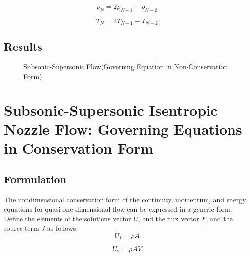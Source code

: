 \begin{equation}
\rho_N=2\rho_{N-1}-\rho_{N-2}
\end{equation}

\begin{equation}
T_N=2T_{N-1}-T_{N-2}
\end{equation}

\subsection{Results}
\begin{figure}[htbp]
\centering
{}%
\centering
{}%
\caption{Subsonic-Supersonic Flow(Governing Equation in Non-Conservation Form)}
\end{figure}


\section{Subsonic-Supersonic Isentropic Nozzle Flow: Governing Equations in Conservation Form}

\subsection{Formulation}

The nondimensional conservation form of the continuity, momentum, and energy equations for quasi-one-dimensional flow can be expressed in a generic form. Define the elements of the solutions vector $U$, and the flux vector $F$, and the source term $J$ as follows:
\begin{equation}
U_1 = \rho A
\end{equation}

\begin{equation}
U_2 = \rho A V
\end{equation}


